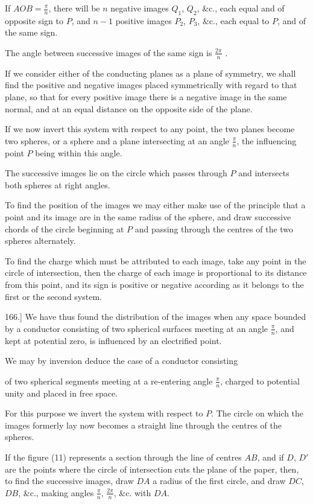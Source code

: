 \documentclass[11pt,a4paper]{article}
\begin{document}
If $AOB=\frac{\pi}{n}$, there will be $n$ negative images $Q_1$,
$Q_2$, \&c., each equal and of opposite sign to $P$, and $n-1$
positive images $P_2$, $P_3$, \&c., each equal to $P$, and of the same
sign.

The angle between successive images of the same sign is  $\frac{2\pi}{n}$ .

If we consider either of the conducting planes as a plane of symmetry,
we shall find the positive and negative images placed symmetrically
with regard to that plane, so that for every positive image there is a
negative image in the same normal, and at an equal distance on the
opposite side of the plane.

If we now invert this system with respect to any point, the two planes
become two spheres, or a sphere and a plane intersecting at an angle
$\frac{\pi}{n}$, the influencing point $P$ being within this angle.

The successive images lie on the circle which passes through $P$ and
intersects both spheres at right angles.

To find the position of the images we may either make use of the
principle that a point and its image are in the same radius of the
sphere, and draw successive chords of the circle beginning at $P$ and
passing through the centres of the two spheres alternately.

To find the charge which must be attributed to each image, take any
point in the circle of intersection, then the charge of each image is
proportional to its distance from this point, and its sign is positive
or negative according as it belongs to the first or the second system.

166.] We have thus found the distribution of the images when any space
bounded by a conductor consisting of two spherical surfaces meeting at
an angle $\frac{\pi}{n}$, and kept at potential zero, is influenced by
an electrified point.

We may by inversion deduce the case of a conductor consisting

of two spherical segments meeting at a re-entering angle
$\frac{\pi}{n}$, charged to potential unity and placed in free space.

For this purpose we invert the system with respect to $P$. The circle
on which the images formerly lay now becomes a straight line through
the centres of the spheres.

If the figure (11) represents a section through the line of centres
$AB$, and if $D$, $D'$ are the points where the circle of intersection
cuts the plane of the paper, then, to find the successive images, draw
$DA$ a radius of the first circle, and draw $DC$, $DB$, \&c., making
angles $\frac{\pi}{n}$, $\frac{2\pi}{n}$, \&c. with $DA$.
\end{document}
